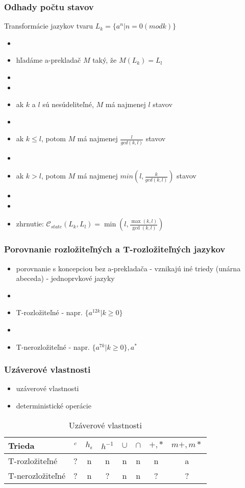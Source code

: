 \documentclass[slovak]{beamer}
\begin{document}
\begin{frame}
\frametitle{Odhady počtu stavov}

Transformácie jazykov tvaru $L_{k} = \{ a^n| n = 0 (mod k)\} $
\begin{itemize}
\item[]
\item hľadáme a-prekladač $M$ taký, že $M(L_{k}) = L_{l}$
\item[]
\item[]
\item ak $k$ a $l$ sú nesúdeliteľné, $M$ má najmenej $l$ stavov
\item[]
\item ak $k \leq l$, potom $M$ má najmenej $\frac{l}{gcd(k,l)}$ stavov 
\item[]
\item ak $k > l$, potom $M$ má najmenej $min(l, \frac{k}{gcd(k,l)})$ stavov
\item[]
\item[]
\item zhrnutie: $\mathcal{C}_{state}(L_k, L_l) = \min (l, \frac{\max (k,l)}{\gcd (k,l)})$
\end{itemize}

\end{frame}

\begin{frame}
\frametitle{Porovnanie rozložiteľných a T-rozložiteľných jazykov}

\begin{itemize}
\item porovnanie s koncepciou bez a-prekladača - vznikajú iné triedy (unárna abeceda) - jednoprvkové jazyky
\item[]
\item T-rozložiteľné - napr. $\{ a^{12k} | k \geq 0 \}$
\item[]
\item T-nerozložiteľné - napr. $\{ a^{7k} | k \geq 0 \}, a^*$
\end{itemize}

\end{frame}

\begin{frame}
\frametitle{Uzáverové vlastnosti}
\begin{itemize}
\item uzáverové vlastnosti
\item deterministické operácie
\end{itemize}
\begin{table}
\begin{tabular}{l | c | c | c | c | c | c | c}
Trieda & $^c$ & $h_{\epsilon}$ & $h^{-1}$ & $\cup$ & $\cap$ & $+,*$ & $m+,m*$ \\
\hline
T-rozložiteľné & ? & n & n & n & n & n & a\\ 
T-nerozložiteľné & ? & n & ? & n & n & ? & ?
\end{tabular}
\caption{Uzáverové vlastnosti}
\end{table}

\end{frame}
\end{document}
